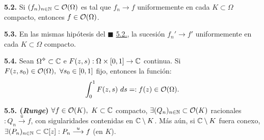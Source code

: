 
\hypertarget{thm252}{}
\begin{theorem}
    \textbf{5.2.} Si \((f_n)_{n\in \mathbb{N}} \subset \mathcal{O}(\Omega)\) es tal que \( f_n \to f\) uniformemente en cada \(K\subset \Omega\) compacto, entonces \(f\in \mathcal{O}(\Omega)\).   
\end{theorem}


\begin{theorem}
    \textbf{5.3.} En las mismas hipótesis del \(\blacksquare\) \hyperlink{thm252}{5.2.}, la sucesión \(f_n'\to f'\) uniformemente en cada \(K\subset \Omega\) compacto. 
\end{theorem}


\begin{theorem}
    \textbf{5.4.} Sean \(\Omega\ab \subset \C\) e \(F(z,s): \Omega \times [0,1] \to \mathbb{C}\) continua. Si \(F(z,s_0) \in \mathcal{O}(\Omega), \ \forall s_0 \in [0,1]\) fijo, entonces la función: 
    \[\int_0^1 F(z,s) \ ds =: f(z) \in \mathcal{O}(\Omega). \]
\end{theorem}

\vspace{-0.3cm}

\begin{theorem}
    \textbf{5.5. (\emph{Runge})} \(\forall f \in \mathcal{O}(K), \ K\subset \mathbb{C}\) compacto, \(\exists (Q_n)_{n\in\mathbb{N}}\subset \mathcal{O}(K)\) racionales \(: Q_n \overset{u}{\longrightarrow} f\), con sigularidades contenidas en \(\mathbb{C}\setminus K\). Más aún, si \(\mathbb{C} \setminus K\) fuera conexo, \(\exists (P_n)_{n\in \mathbb{N}} \subset \mathbb{C}[z] : P_n \overset{u}{\longrightarrow} f\) (en \(K\)). 
\end{theorem}

